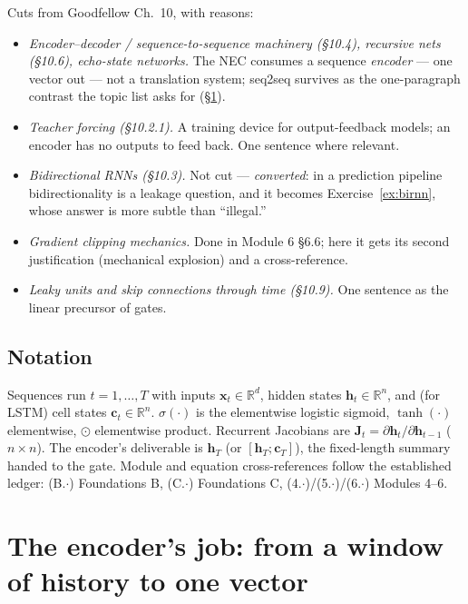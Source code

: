 \documentclass[11pt]{article}
\numberwithin{equation}{section}
\theoremstyle{plain}
\theoremstyle{definition}
\theoremstyle{remark}
\newcommand{\R}{\mathbb{R}}
\newcommand{\x}{\bm{x}}
\newcommand{\bh}{\bm{h}}
\newcommand{\bc}{\bm{c}}
\newcommand{\bJ}{\bm{J}}
\newcommand{\sg}{\sigma}
\begin{document}
Cuts from Goodfellow Ch.\ 10, with reasons:
\begin{itemize}[leftmargin=2em,itemsep=0.15em]
\item \emph{Encoder--decoder / sequence-to-sequence machinery (\S10.4), recursive nets (\S10.6), echo-state networks.} The NEC consumes a sequence \emph{encoder} --- one vector out --- not a translation system; seq2seq survives as the one-paragraph contrast the topic list asks for (\S\ref{sec:setup}).
\item \emph{Teacher forcing (\S10.2.1).} A training device for output-feedback models; an encoder has no outputs to feed back. One sentence where relevant.
\item \emph{Bidirectional RNNs (\S10.3).} Not cut --- \emph{converted}: in a prediction pipeline bidirectionality is a leakage question, and it becomes Exercise~\ref{ex:birnn}, whose answer is more subtle than ``illegal.''
\item \emph{Gradient clipping mechanics.} Done in Module 6 \S6.6; here it gets its second justification (mechanical explosion) and a cross-reference.
\item \emph{Leaky units and skip connections through time (\S10.9).} One sentence as the linear precursor of gates.
\end{itemize}

\subsection*{Notation}

Sequences run $t = 1, \dots, T$ with inputs $\x_t \in \R^{d}$, hidden states $\bh_t \in \R^{n}$, and (for LSTM) cell states $\bc_t \in \R^n$. $\sg(\cdot)$ is the elementwise logistic sigmoid, $\tanh(\cdot)$ elementwise, $\odot$ elementwise product. Recurrent Jacobians are $\bJ_t = \partial \bh_t / \partial \bh_{t-1}$ ($n \times n$). The encoder's deliverable is $\bh_T$ (or $[\bh_T; \bc_T]$), the fixed-length summary handed to the gate. Module and equation cross-references follow the established ledger: (B.$\cdot$) Foundations B, (C.$\cdot$) Foundations C, (4.$\cdot$)/(5.$\cdot$)/(6.$\cdot$) Modules 4--6.

\section{The encoder's job: from a window of history to one vector}\label{sec:setup}
\end{document}
